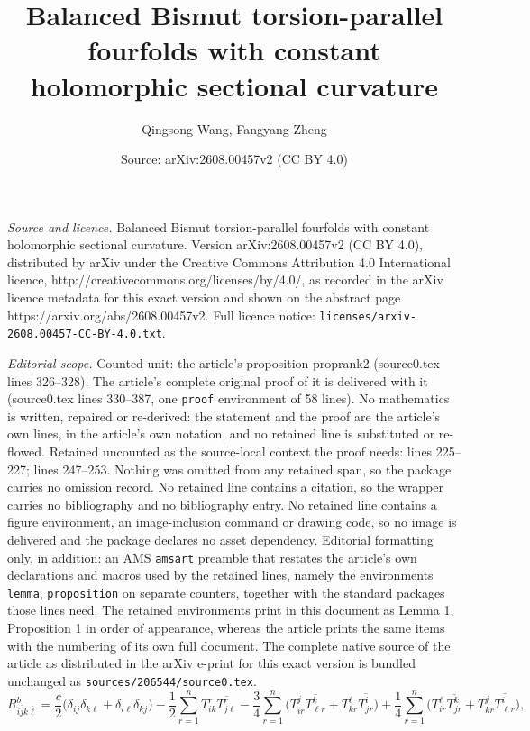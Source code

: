 \documentclass[10pt,a4paper]{amsart}
\title{Balanced Bismut torsion-parallel fourfolds with constant holomorphic sectional curvature}
\author{Qingsong Wang, Fangyang Zheng}
\date{Source: arXiv:2608.00457v2 (CC BY 4.0)}
\begin{document}
\maketitle

\noindent\emph{Source and licence.} Balanced Bismut torsion-parallel fourfolds with constant holomorphic sectional curvature. Version arXiv:2608.00457v2 (CC BY 4.0), distributed by arXiv under the Creative Commons Attribution 4.0 International licence, http://creativecommons.org/licenses/by/4.0/, as recorded in the arXiv licence metadata for this exact version and shown on the abstract page https://arxiv.org/abs/2608.00457v2. Full licence notice: \texttt{licenses/arxiv-2608.00457-CC-BY-4.0.txt}.\par\smallskip

\noindent\textit{Editorial scope.} Counted unit: the article's proposition proprank2 (source0.tex lines 326--328). The article's complete original proof of it is delivered with it (source0.tex lines 330--387, one \texttt{proof} environment of 58 lines). No mathematics is written, repaired or re-derived: the statement and the proof are the article's own lines, in the article's own notation, and no retained line is substituted or re-flowed.  Retained uncounted as the source-local context the proof needs: lines 225--227; lines 247--253.  Nothing was omitted from any retained span, so the package carries no omission record.  No retained line contains a citation, so the wrapper carries no bibliography and no bibliography entry.  No retained line contains a figure environment, an image-inclusion command or drawing code, so no image is delivered and the package declares no asset dependency.  Editorial formatting only, in addition: an AMS \texttt{amsart} preamble that restates the article's own declarations and macros used by the retained lines, namely the environments \texttt{lemma}, \texttt{proposition} on separate counters, together with the standard packages those lines need.  The retained environments print in this document as Lemma 1, Proposition 1 in order of appearance, whereas the article prints the same items with the numbering of its own full document.  The complete native source of the article as distributed in the arXiv e-print for this exact version is bundled unchanged as \texttt{sources/206544/source0.tex}.
\begin{equation} \label{eq:Rb}
R^b_{i\bar{j}k\bar{\ell}} = \frac{c}{2} \big( \delta_{ij}\delta_{k\ell} + \delta_{i\ell}\delta_{kj} \big) - \frac{1}{2}\sum_{r=1}^n T^r_{ik} \overline{ T^r_{j\ell }} - \frac{3}{4}\sum_{r=1}^n \big( T^j_{ir} \overline{ T^k_{\ell r}} + T^{\ell}_{kr} \overline{ T^i_{j r}}  \big) + \frac{1}{4}\sum_{r=1}^n \big( T^{\ell}_{ir} \overline{ T^k_{j r}} + T^{j}_{kr} \overline{ T^i_{\ell r}}  \big),
\end{equation}
\end{document}
